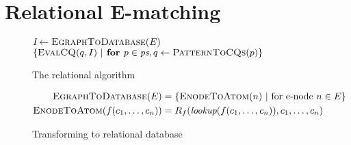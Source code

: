 \chapter{Relational E-matching}


\begin{figure}
    \centering
    \begin{algorithmic}[1]
    \State $\textit{I}\gets \textsc{EgraphToDatabase}(E)$
    \State \Return $\{\textsc{EvalCQ}(q, I)\ |\textbf{ for } p\in \textit{ps}, q\gets \textsc{PatternToCQs}(p)\}$
    \EndProcedure
    \end{algorithmic}
    \caption{The relational \ematching algorithm}
    \label{fig:main}
\end{figure}

\begin{figure}
    \centering
    \begin{align*}
        \textsc{EgraphToDatabase}(E) &= \{\textsc{EnodeToAtom}(n)\ |\text{ for \enode\ } n\in E\}\\
        \textsc{EnodeToAtom}(f(c_1,\ldots,c_n)) &= R_f(\textit{lookup}(f(c_1,\ldots,c_n)), c_1,\ldots, c_n)
    \end{align*}
    \caption{Transforming \egraphs to relational database}
    \label{fig:egraph_to_db}
\end{figure}

